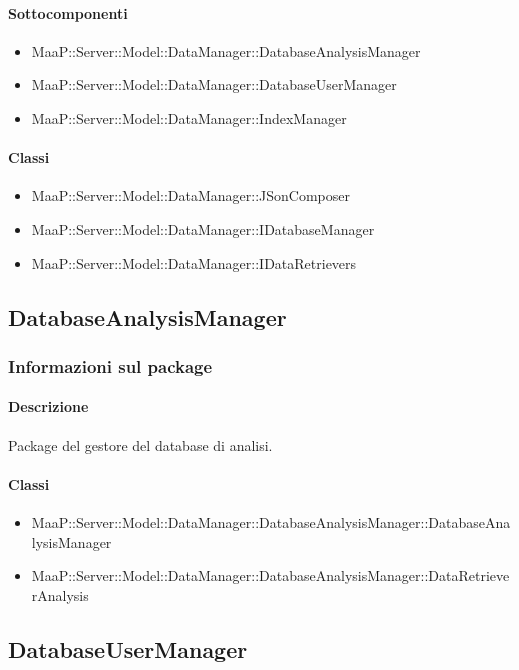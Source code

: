 \paragraph{Sottocomponenti}
\begin{itemize}
\item MaaP::Server::Model::DataManager::DatabaseAnalysisManager
\item MaaP::Server::Model::DataManager::DatabaseUserManager
\item MaaP::Server::Model::DataManager::IndexManager
\end{itemize}

\paragraph{Classi}
\begin{itemize}
\item MaaP::Server::Model::DataManager::JSonComposer
\item MaaP::Server::Model::DataManager::IDatabaseManager
\item MaaP::Server::Model::DataManager::IDataRetrievers
\end{itemize}

\subsection{DatabaseAnalysisManager}
\subsubsection{Informazioni sul package}
\paragraph{Descrizione}
Package del gestore del database di analisi.

\paragraph{Classi}
\begin{itemize}
\item MaaP::Server::Model::DataManager::DatabaseAnalysisManager::DatabaseAnalysisManager
\item MaaP::Server::Model::DataManager::DatabaseAnalysisManager::DataRetrieverAnalysis
\end{itemize}

\subsection{DatabaseUserManager}
